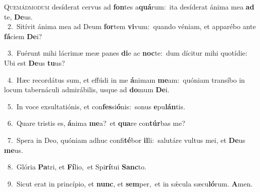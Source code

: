 \lettrine{\initial\textcolor{\initialcolor}{Q}}{uemádmodum} desíderat cervus ad \textbf{fon}\-tes a\-\textbf{quá}\-rum:~\star ita desíderat ánima mea \textbf{ad} te, \textbf{De}\-us.\\
{\numbfont\textcolor{\numbcolor}{~2.}}~Sitívit ánima mea ad Deum \textbf{for}\-tem \textbf{vi}\-vum:~\star quando véniam, et apparébo ante \textbf{fá}\-ciem \textbf{De}\-i?\par
{\numbfont\textcolor{\numbcolor}{~3.}}~Fuérunt mihi lácrimæ meæ panes \textbf{di}\-e ac \textbf{noc}\-te:~\star dum dícitur mihi quotídie: Ubi est \textbf{De}\-us \textbf{tu}\-us?\par
{\numbfont\textcolor{\numbcolor}{~4.}}~Hæc recordátus sum, et effúdi in me \textbf{á}\-nimam \textbf{me}\-am:~\star quóniam transíbo in locum tabernáculi admirábilis, usque ad \textbf{do}\-mum \textbf{De}\-i.\par
{\numbfont\textcolor{\numbcolor}{~5.}}~In voce exsultatiónis, et con\-\textbf{fes}\-si\-\textbf{ó}\-nis:~\star sonus \textbf{e}\-pu\-\textbf{lán}\-tis.\par
{\numbfont\textcolor{\numbcolor}{~6.}}~Quare tristis es, \textbf{á}\-nima \textbf{me}\-a?~\star et \textbf{qua}\-re con\-\textbf{túr}\-bas me?\par
{\numbfont\textcolor{\numbcolor}{~7.}}~Spera in Deo, quóniam adhuc confi\-\textbf{té}\-bor \textbf{il}\-li:~\star salutáre vultus mei, et \textbf{De}\-us \textbf{me}\-us.\par
{\numbfont\textcolor{\numbcolor}{~8.}}~Glória \textbf{Pa}\-tri, et \textbf{Fí}\-lio,~\star et Spi\-\textbf{rí}\-tui \textbf{Sanc}\-to.\par
{\numbfont\textcolor{\numbcolor}{~9.}}~Sicut erat in princípio, et \textbf{nunc}\-, et \textbf{sem}\-per,~\star et in sǽcula sæcu\-\textbf{ló}\-rum. \textbf{A}\-men.\par
